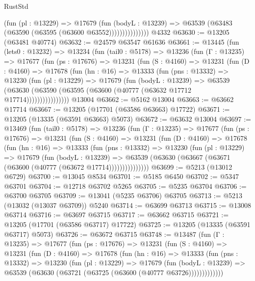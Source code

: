 \begin{lexlean}{RustStd}
\begin{coremodule}
                      (fun (pl : @13229) =>
                      @17679
                        (fun (bodyL : @13239) =>
                        @63539 (@63483 (@63590 (@63595 (@63600 @63552)))))))))))))))
    @4332
@63630 := @13205 (@63481 @40774)
@63632 := @24579 @63547 @61636
@63661 := @13445
    (fun (lets0 : @13232) =>
    @13234
      (fun (tail0 : @5178) =>
      @13236
        (fun (Γ : @13235) =>
        @17677
          (fun (ps : @17676) =>
          @13231
            (fun (S : @4160) =>
            @13231
              (fun (D : @4160) =>
              @17678
                (fun (hn : @16) =>
                @13333
                  (fun (pns : @13332) =>
                  @13230
                    (fun (pl : @13229) =>
                    @17679
                      (fun (bodyL : @13239) =>
                      @63539
                        (@63630
                          (@63590 (@63595 (@63600 (@40777 (@63632 @17712 @17714))))))))))))))))
    @13004
@63662 := @5162 @13004
@63663 := @63662 @17714
@63667 := @13205 (@17701 (@63586 @63663) @17722)
@63671 := @13205 (@13335 (@63591 @63663) @5073)
@63672 := @63632 @13004
@63697 := @13469
    (fun (tail0 : @5178) =>
    @13236
      (fun (Γ : @13235) =>
      @17677
        (fun (ps : @17676) =>
        @13231
          (fun (S : @4160) =>
          @13231
            (fun (D : @4160) =>
            @17678
              (fun (hn : @16) =>
              @13333
                (fun (pns : @13332) =>
                @13230
                  (fun (pl : @13229) =>
                  @17679
                    (fun (bodyL : @13239) =>
                    @63539 (@63630 (@63667 (@63671 (@63600 (@40777 (@63672 @17714)))))))))))))))
@63699 := @5213 (@13012 @6729)
@63700 := @13045 @8534
@63701 := @5185 @6450
@63702 := @5347 @63701
@63704 := @12718 @63702 @5265
@63705 := @5235 @63704
@63706 := @63700 @63705
@63709 := @13041 (@5235 @63706) @63705
@63713 := @5213 (@13032 (@13037 @63709)) @5240
@63714 := @63699 @63713
@63715 := @13008 @63714
@63716 := @63697 @63715
@63717 := @63662 @63715
@63721 := @13205 (@17701 (@63586 @63717) @17722)
@63725 := @13205 (@13335 (@63591 @63717) @5073)
@63726 := @63672 @63715
@63748 := @13487
    (fun (Γ : @13235) =>
    @17677
      (fun (ps : @17676) =>
      @13231
        (fun (S : @4160) =>
        @13231
          (fun (D : @4160) =>
          @17678
            (fun (hn : @16) =>
            @13333
              (fun (pns : @13332) =>
              @13230
                (fun (pl : @13229) =>
                @17679
                  (fun (bodyL : @13239) =>
                  @63539 (@63630 (@63721 (@63725 (@63600 (@40777 @63726)))))))))))))

\end{coremodule}
\end{lexlean}
